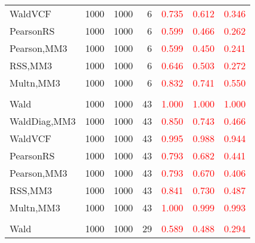 \documentclass[
]{article}
\begin{document}
\begin{table}[H]
{\begin{tabular}[t]{lrrrrrr}
\hspace{1em}WaldVCF & 1000 & 1000 & 6 & \textcolor{red}{0.735} & \textcolor{red}{0.612} & \textcolor{red}{0.346}\\
\hspace{1em}PearsonRS & 1000 & 1000 & 6 & \textcolor{red}{0.599} & \textcolor{red}{0.466} & \textcolor{red}{0.262}\\
\hspace{1em}Pearson,MM3 & 1000 & 1000 & 6 & \textcolor{red}{0.599} & \textcolor{red}{0.450} & \textcolor{red}{0.241}\\
\hspace{1em}RSS,MM3 & 1000 & 1000 & 6 & \textcolor{red}{0.646} & \textcolor{red}{0.503} & \textcolor{red}{0.272}\\
\hspace{1em}Multn,MM3 & 1000 & 1000 & 6 & \textcolor{red}{0.832} & \textcolor{red}{0.741} & \textcolor{red}{0.550}\\
\addlinespace[0.3em]
\multicolumn{7}{l}{\textbf{1F 15V}}\\
\hspace{1em}Wald & 1000 & 1000 & 43 & \textcolor{red}{1.000} & \textcolor{red}{1.000} & \textcolor{red}{1.000}\\
\hspace{1em}WaldDiag,MM3 & 1000 & 1000 & 43 & \textcolor{red}{0.850} & \textcolor{red}{0.743} & \textcolor{red}{0.466}\\
\hspace{1em}WaldVCF & 1000 & 1000 & 43 & \textcolor{red}{0.995} & \textcolor{red}{0.988} & \textcolor{red}{0.944}\\
\hspace{1em}PearsonRS & 1000 & 1000 & 43 & \textcolor{red}{0.793} & \textcolor{red}{0.682} & \textcolor{red}{0.441}\\
\hspace{1em}Pearson,MM3 & 1000 & 1000 & 43 & \textcolor{red}{0.793} & \textcolor{red}{0.670} & \textcolor{red}{0.406}\\
\hspace{1em}RSS,MM3 & 1000 & 1000 & 43 & \textcolor{red}{0.841} & \textcolor{red}{0.730} & \textcolor{red}{0.487}\\
\hspace{1em}Multn,MM3 & 1000 & 1000 & 43 & \textcolor{red}{1.000} & \textcolor{red}{0.999} & \textcolor{red}{0.993}\\
\addlinespace[0.3em]
\multicolumn{7}{l}{\textbf{2F 10V}}\\
\hspace{1em}Wald & 1000 & 1000 & 29 & \textcolor{red}{0.589} & \textcolor{red}{0.488} & \textcolor{red}{0.294}\\

\end{tabular}}
\end{table}
\end{document}
